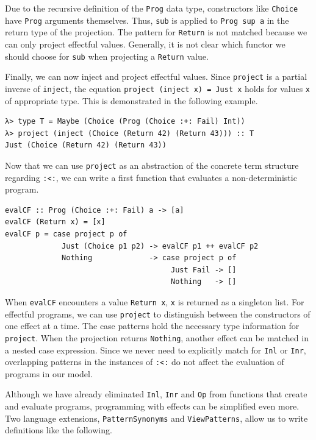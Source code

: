 \documentclass[a4paper, 11pt, fleqn, twoside, abstract=on]{scrreprt}
\newcommand{\hinl}[1]{\texttt{#1}}
\newcommand{\cinl}[1]{\texttt{#1}}
\begin{document}
Due to the recursive definition of the \hinl{Prog} data type, constructors like \hinl{Choice} have \hinl{Prog} arguments themselves.
Thus, \hinl{sub} is applied to \hinl{Prog sup a} in the return type of the projection.
The pattern for \cinl{Return} is not matched because we can only project effectful values.
Generally, it is not clear which functor we should choose for \hinl{sub} when projecting a \hinl{Return} value.

Finally, we can now inject and project effectful values.
Since \hinl{project} is a partial inverse of \hinl{inject}, the equation \hinl{project (inject x) = Just x} holds for values \hinl{x} of appropriate type.
This is demonstrated in the following example.

\begin{verbatim}
λ> type T = Maybe (Choice (Prog (Choice :+: Fail) Int))
λ> project (inject (Choice (Return 42) (Return 43))) :: T
Just (Choice (Return 42) (Return 43))
\end{verbatim}

Now that we can use \hinl{project} as an abstraction of the concrete term structure regarding \hinl{:<:}, we can write a first function that evaluates a non-deterministic program.

\begin{verbatim}
evalCF :: Prog (Choice :+: Fail) a -> [a]
evalCF (Return x) = [x]
evalCF p = case project p of
             Just (Choice p1 p2) -> evalCF p1 ++ evalCF p2
             Nothing             -> case project p of
                                      Just Fail -> []
                                      Nothing   -> []
\end{verbatim}
\noindent
When \hinl{evalCF} encounters a value \hinl{Return x}, \hinl{x} is returned as a singleton list.
For effectful programs, we can use \hinl{project} to distinguish between the constructors of one effect at a time.
The case patterns hold the necessary type information for \hinl{project}.
When the projection returns \hinl{Nothing}, another effect can be matched in a nested case expression.
Since we never need to explicitly match for \hinl{Inl} or \hinl{Inr}, overlapping patterns in the instances of \hinl{:<:} do not affect the evaluation of programs in our model.

Although we have already eliminated \hinl{Inl}, \hinl{Inr} and \hinl{Op} from functions that create and evaluate programs, programming with effects can be simplified even more.
Two language extensions, \hinl{PatternSynonyms} and \hinl{ViewPatterns}, allow us to write definitions like the following.
\end{document}
